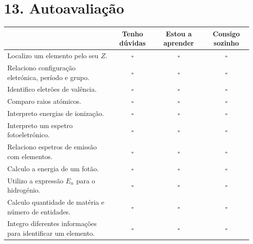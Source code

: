 \documentclass[11pt,a4paper]{article}
\begin{document}
	
	\section*{\textcolor{eublue}{13. Autoavaliação}}
	
	\begin{center}
		
		\small
		
		\begin{tabularx}{\textwidth}{
				>{\raggedright\arraybackslash}X
				c c c
			}
			
			\toprule
			
			&
			\textbf{Tenho dúvidas}
			&
			\textbf{Estou a aprender}
			&
			\textbf{Consigo sozinho}
			\\
			
			\midrule
			
			Localizo um elemento pelo seu \(Z\).
			&
			\(\square\)&\(\square\)&\(\square\)
			\\[3mm]
			
			Relaciono configuração eletrónica, período e grupo.
			&
			\(\square\)&\(\square\)&\(\square\)
			\\[3mm]
			
			Identifico eletrões de valência.
			&
			\(\square\)&\(\square\)&\(\square\)
			\\[3mm]
			
			Comparo raios atómicos.
			&
			\(\square\)&\(\square\)&\(\square\)
			\\[3mm]
			
			Interpreto energias de ionização.
			&
			\(\square\)&\(\square\)&\(\square\)
			\\[3mm]
			
			Interpreto um espetro fotoeletrónico.
			&
			\(\square\)&\(\square\)&\(\square\)
			\\[3mm]
			
			Relaciono espetros de emissão com elementos.
			&
			\(\square\)&\(\square\)&\(\square\)
			\\[3mm]
			
			Calculo a energia de um fotão.
			&
			\(\square\)&\(\square\)&\(\square\)
			\\[3mm]
			
			Utilizo a expressão \(E_n\) para o hidrogénio.
			&
			\(\square\)&\(\square\)&\(\square\)
			\\[3mm]
			
			Calculo quantidade de matéria e número de entidades.
			&
			\(\square\)&\(\square\)&\(\square\)
			\\[3mm]
			
			Integro diferentes informações para identificar um elemento.
			&
			\(\square\)&\(\square\)&\(\square\)
			\\
			
			\bottomrule
			
		\end{tabularx}
		
	\end{center}
	
\end{document}
